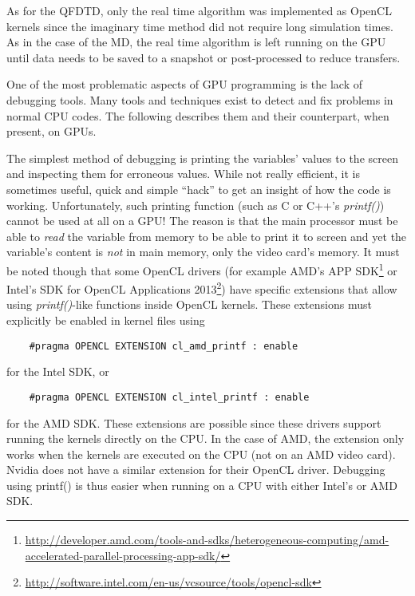 As for the QFDTD, only the real time algorithm was implemented as OpenCL
kernels since the imaginary time method did not require long simulation times.
As in the case of the MD, the real time algorithm is left running on the GPU
until data needs to be saved to a snapshot or post-processed to reduce
transfers.




One of the most problematic aspects of GPU programming is the lack of debugging
tools. Many tools and techniques exist to detect and fix problems in
normal CPU codes. The following describes them and their counterpart, when present,
on GPUs.



The simplest method of debugging is printing the variables' values to the screen
and inspecting them for
erroneous values. While not really efficient, it is sometimes useful, quick
and simple ``hack'' to get an insight of how the code is working. Unfortunately,
such printing function (such as C or C++'s \textit{printf()}) cannot be used at
all on a GPU! The reason is that the main processor must be able to
\textit{read} the variable from memory to be able to print it to screen and yet
the variable's content is \textit{not} in main memory, only the video card's
memory. It must be noted though that some OpenCL drivers (for example AMD's
APP SDK\footnote{\url{http://developer.amd.com/tools-and-sdks/heterogeneous-computing/amd-accelerated-parallel-processing-app-sdk/}}
or Intel's SDK for OpenCL Applications
2013\footnote{\url{http://software.intel.com/en-us/vcsource/tools/opencl-sdk}})
have specific extensions that allow using \textit{printf()}-like functions
inside OpenCL kernels. These extensions must explicitly be enabled in kernel
files using
\begin{verbatim}
    #pragma OPENCL EXTENSION cl_amd_printf : enable
\end{verbatim}
for the Intel SDK, or
\begin{verbatim}
    #pragma OPENCL EXTENSION cl_intel_printf : enable
\end{verbatim}
for the AMD SDK. These extensions are possible since these drivers support
running the kernels directly on the CPU. In the case of AMD, the extension only
works when the kernels are executed on the CPU (not on an AMD video card). Nvidia
does not have a similar extension for their OpenCL driver. Debugging using
printf() is thus easier when running on a CPU with either Intel's or AMD SDK.


